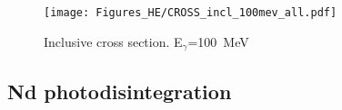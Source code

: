         \begin{figure}[h]
            \begin{center}
            \texttt{[image: Figures\_HE/CROSS\_incl\_100mev\_all.pdf]}
            \end{center}
            \caption{Inclusive cross section. E$_\gamma$=100~MeV}
        \end{figure}

            
\clearpage


\subsection{Nd photodisintegration}

